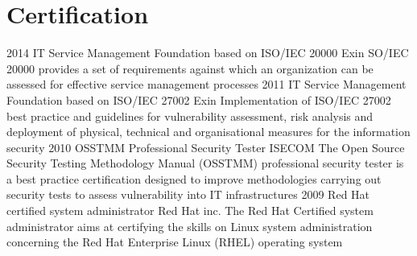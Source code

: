 \documentclass[]{friggeri-cv} %
\begin{document}


\section{Certification}
\begin{entrylist}
\entry
{2014}
{IT Service Management Foundation based on ISO/IEC 20000}
{Exin}
{SO/IEC 20000 provides a set of requirements against which an organization can be assessed for effective service management processes}
\entry
{2011}
{IT Service Management Foundation based on ISO/IEC 27002}
{Exin}
{Implementation of ISO/IEC 27002 best practice and guidelines for vulnerability assessment, risk analysis and deployment of physical, technical and organisational measures for the information security}
\entry
{2010}
{OSSTMM Professional Security Tester}
{ISECOM}
{The Open Source Security Testing Methodology Manual (OSSTMM) professional security tester is a best practice certification designed to improve methodologies carrying out security tests to assess vulnerability into IT infrastructures}
\entry
{2009}
{Red Hat certified system administrator}
{Red Hat inc.}
{The Red Hat Certified system administrator aims at certifying the skills on Linux system administration concerning the Red Hat Enterprise Linux (RHEL) operating system}
\end{entrylist}


\end{document}
